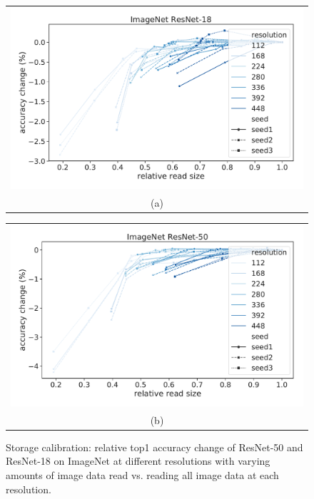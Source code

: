 \begin{figure}
    \centering
    \begin{tabular}{@{}c@{}}
    \includegraphics[width=\textwidth]{e2e_figures/calibration_imagenetresnet18.pdf}\\
    \small (a)
    \end{tabular}
    \begin{tabular}{@{}c@{}}
    \includegraphics[width=\textwidth]{e2e_figures/calibration_imagenetresnet50.pdf}\\
    \small (b)
    \end{tabular}
    \caption{Storage calibration: relative top1 accuracy change of ResNet-50 and ResNet-18 on ImageNet at different resolutions with varying amounts of image data read vs. reading all image data at each resolution. 
    }
    
    \label{fig:calibration_imagenet_ssim}
\end{figure}
